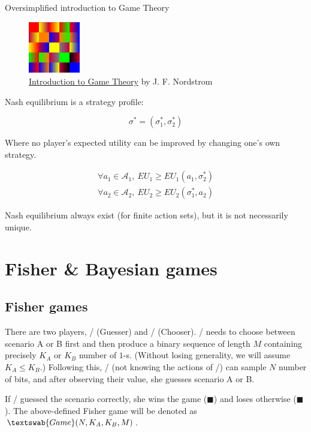 \documentclass{beamer}
\theoremstyle{definition}
\newcommand{\G}[1]{$\textswab{Game}(#1)$}
\begin{document}
\begin{frame}{Oversimplified introduction to Game Theory}

\begin{figure}
    \centering
    \includegraphics[width=0.2\textwidth]{img/GameTheoryLogo.png}
    \caption{\tiny \centering \href{https://nordstrommath.com/IntroGameTheoryv4-2020.pdf}{Introduction to Game Theory} by J. F. Nordstrom}
\end{figure}

Nash equilibrium is a strategy profile:

\[
\sigma^* = (\sigma_1^*,\sigma_2^*)
\]

Where no player’s expected utility can be improved by changing one’s own strategy.

\[
\begin{split}
    \forall a_1 \in \mathcal{A}_1, \  EU_1 \ge EU_1(a_1,\sigma_2^*) \\
    \forall a_2 \in \mathcal{A}_2, \  EU_2 \ge EU_2(\sigma_1^*,a_2)
\end{split}
\]



Nash equilibrium always exist (for finite action sets), but it is not necessarily unique.

\end{frame}


\section{Fisher \& Bayesian games}

\subsection{Fisher games}

\begin{frame}{}

\begin{definition}
\label{def:FisherGame}
There are two players, \PI/ (Guesser) and \PII/ (Chooser).
\PII/ needs to choose between scenario A or B first and then produce a binary sequence of length $M$ containing precisely $K_A$ or $K_B$ number of $1$-s. (Without losing generality, we will assume $K_A \le K_B$.)
Following this, \PI/ (not knowing the actions of \PII/) can sample $N$ number of bits, and after observing their value, she guesses scenario A or B.

If \PI/ guessed the scenario correctly, she wins the game (\textcolor{w}{$\blacksquare$}) and loses otherwise (\textcolor{l}{$\blacksquare$}). 
The above-defined Fisher game will be denoted as 
\G{N, K_A, K_B, M}.

\end{definition}


\end{frame}
\end{document}
